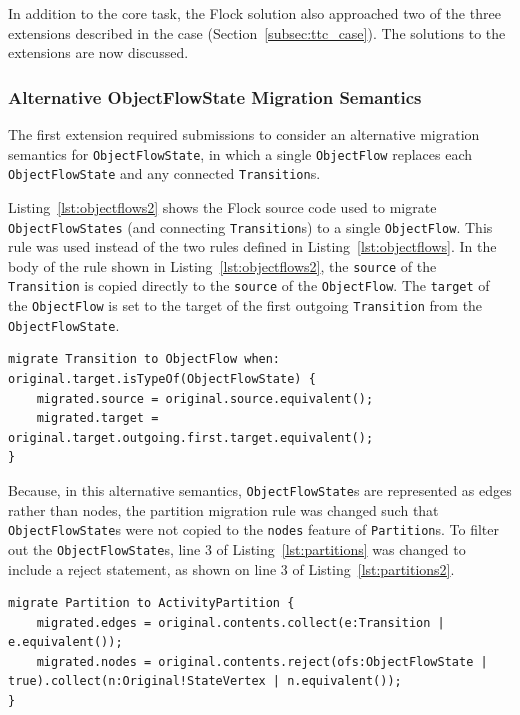In addition to the core task, the Flock solution also approached two of the three extensions described in the case (Section~\ref{subsec:ttc_case}). The solutions to the extensions are now discussed.

\subsubsection{Alternative ObjectFlowState Migration Semantics}
The first extension required submissions to consider an alternative migration semantics for \texttt{Ob\-je\-ctFl\-owSt\-a\-te}, in which a single \texttt{Ob\-je\-ctFl\-ow} replaces each \texttt{Ob\-je\-ctFl\-owSt\-a\-te} and any connected \texttt{Tr\-an\-si\-ti\-on}s.

Listing~\ref{lst:objectflows2} shows the Flock source code used to migrate \texttt{Ob\-je\-ctFl\-owSt\-at\-es} (and connecting \texttt{Tr\-an\-si\-ti\-on}s) to a single \texttt{Ob\-je\-ctFl\-ow}. This rule was used instead of the two rules defined in Listing~\ref{lst:objectflows}. In the body of the rule shown in Listing~\ref{lst:objectflows2}, the \texttt{so\-ur\-ce} of the \texttt{Tr\-an\-si\-ti\-on} is copied directly to the \texttt{so\-u\-rce} of the \texttt{Ob\-je\-ctFl\-ow}. The \texttt{ta\-rg\-et} of the \texttt{Ob\-je\-ctFl\-ow} is set to the target of the first outgoing \texttt{Tr\-an\-si\-ti\-on} from the \texttt{Ob\-je\-ctFl\-owSt\-a\-te}. 

\begin{lstlisting}[caption=Migrating ObjectFlowStates to a single ObjectFlow, label=lst:objectflows2, language=Flock]
migrate Transition to ObjectFlow when: original.target.isTypeOf(ObjectFlowState) {
	migrated.source = original.source.equivalent();
	migrated.target = original.target.outgoing.first.target.equivalent();
}
\end{lstlisting}

Because, in this alternative semantics, \texttt{Ob\-je\-ctFl\-owSt\-a\-te}s are represented as edges rather than nodes, the partition migration rule was changed such that \texttt{Ob\-je\-ctFl\-owSt\-a\-te}s were not copied to the \texttt{no\-des} feature of \texttt{Pa\-rt\-it\-i\-on}s. To filter out the \texttt{Ob\-je\-ctFl\-owSt\-a\-te}s, line 3 of Listing~\ref{lst:partitions} was changed to include a reject statement, as shown on line 3 of Listing~\ref{lst:partitions2}.

\begin{lstlisting}[caption=Migrating Partitions without ObjectFlowStates, label=lst:partitions2, language=Flock]
migrate Partition to ActivityPartition {
	migrated.edges = original.contents.collect(e:Transition | e.equivalent());
	migrated.nodes = original.contents.reject(ofs:ObjectFlowState | true).collect(n:Original!StateVertex | n.equivalent());	
}
\end{lstlisting}


